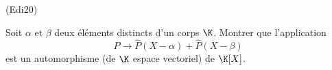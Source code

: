 \begin{tiny}(Edi20)\end{tiny} Soit $\alpha$ et $\beta$ deux éléments distincts d'un corps $\K$. Montrer que l'application
\begin{displaymath}
 P \rightarrow \widehat{P}(X-\alpha) + \widehat{P}(X-\beta)
\end{displaymath}
 est un automorphisme (de $\K$ espace vectoriel) de $\K[X]$.